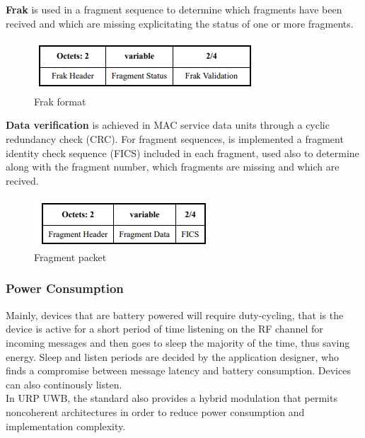 \documentclass[conference]{IEEEtran}
\begin{document}
\textbf{Frak} is used in a fragment sequence to determine which fragments have been recived
and which are missing explicitating the status of one or more fragments.\\

\begin{figure} [!h]
  \centering
  \includegraphics[width=.7\linewidth]{FRAK}
  \caption{Frak format}
  \label{fig:ack}
\end{figure}


\textbf{Data verification} is achieved in MAC service data units through a cyclic redundancy
check (CRC). For fragment sequences, is implemented a fragment identity check sequence (FICS)
included in each fragment, used also to determine along with the fragment number, which
fragments are missing and which are recived.\\

\begin{figure}[!h]
  \centering
  \includegraphics[width=.6\linewidth]{fragment-packet}
  \caption{Fragment packet}
  \label{fig:fragment}
\end{figure}

\subsubsection{Power Consumption}
Mainly, devices that are battery powered will require duty-cycling, that is
the device is active for a short period of time listening on the RF channel for incoming
messages and then goes to sleep the majority of the time, thus saving energy.
Sleep and listen periods are decided by the application designer, who finds a compromise
between message latency and battery consumption. Devices can also continously listen.\\

In URP UWB, the standard also provides a hybrid modulation that permits noncoherent 
architectures in order to reduce power consumption and implementation complexity.\\
\end{document}
